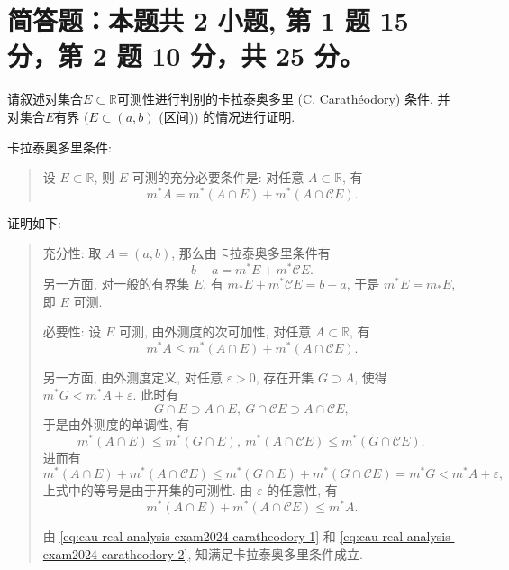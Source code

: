 \section{简答题：本题共 2 小题, 第 1 题 15 分，第 2 题 10 分，共 25 分。}



\begin{question}[points = 15]
  请叙述对集合$E\subset \mathbb{R}$可测性进行判别的卡拉泰奥多里 (C. Carathéodory) 条件, 并对集合$E$有界 ($E \subset (a, b)$ (区间)) 的情况进行证明.
\end{question}

\begin{solution}
  卡拉泰奥多里条件: 

  \begin{quote}
  设 \(E \subset \mathbb{R}\), 则 \(E\) 可测的充分必要条件是: 对任意 \(A \subset \mathbb{R}\), 有
  \[m^* A = m^*(A \cap E) + m^*(A \cap \mathscr{C} E).\]
  \end{quote}

  证明如下:

  \begin{quote}
  充分性: 
  取 \(A = (a, b)\), 那么由卡拉泰奥多里条件有
  \[b - a = m^* E + m^* \mathscr{C} E.\]
  另一方面, 对一般的有界集 \(E\), 有 \(m_* E + m^* \mathscr{C} E = b - a\), 于是 \(m^* E = m_* E\), 即 \(E\) 可测.

  必要性: 
  设 \(E\) 可测, 由外测度的次可加性, 对任意 \(A \subset \mathbb{R}\), 有
  \begin{equation}
  \label{eq:cau-real-analysis-exam2024-caratheodory-1}
  m^* A \leqslant m^*(A \cap E) + m^*(A \cap \mathscr{C} E).
  \end{equation}

  另一方面, 由外测度定义, 对任意 \(\varepsilon > 0\), 存在开集 \(G \supset A\), 使得 \(m^* G < m^* A + \varepsilon\). 此时有
  \[G \cap E \supset A \cap E, ~ G \cap \mathscr{C} E \supset A \cap \mathscr{C} E,\]
  于是由外测度的单调性, 有
  \[m^* (A \cap E) \leqslant m^* (G \cap E), ~ m^* (A \cap \mathscr{C} E) \leqslant m^* (G \cap \mathscr{C} E),\]
  进而有
  \[m^* (A \cap E) + m^* (A \cap \mathscr{C} E) \leqslant m^* (G \cap E) + m^* (G \cap \mathscr{C} E) = m^* G < m^* A + \varepsilon,\]
  上式中的等号是由于开集的可测性. 由 \(\varepsilon\) 的任意性, 有
  \begin{equation}
  \label{eq:cau-real-analysis-exam2024-caratheodory-2}
  m^* (A \cap E) + m^* (A \cap \mathscr{C} E) \leqslant m^* A.
  \end{equation}

  由 \eqref{eq:cau-real-analysis-exam2024-caratheodory-1} 和 \eqref{eq:cau-real-analysis-exam2024-caratheodory-2}, 知满足卡拉泰奥多里条件成立.
  \end{quote}
\end{solution}

